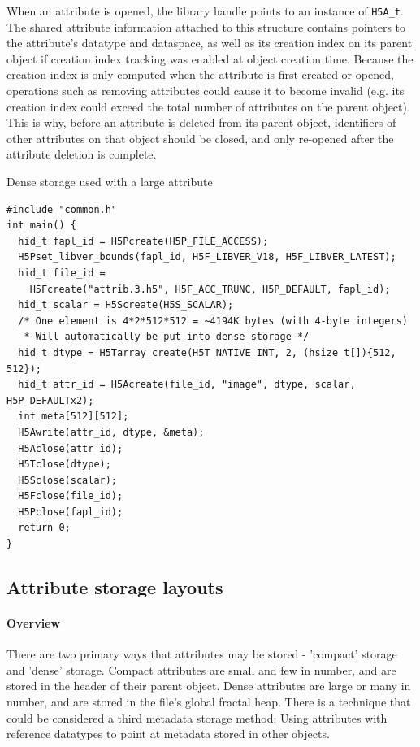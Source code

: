 When an attribute is opened, the library handle points to an instance of \texttt{H5A\_t}. The shared attribute information attached to this structure contains pointers to the attribute's datatype and dataspace, as well as its creation index on its parent object if creation index tracking was enabled at object creation time. Because the creation index is only computed when the attribute is first created or opened, operations such as removing attributes could cause it to become invalid (e.g. its creation index could exceed the total number of attributes on the parent object). This is why, before an attribute is deleted from its parent object, identifiers of other attributes on that object should be closed, and only re-opened after the attribute deletion is complete.

\begin{listing}
\centering
\caption{Dense storage used with a large attribute}
\label{lst:attribute-dense-storage-large}
\begin{verbatim}
#include "common.h"
int main() {
  hid_t fapl_id = H5Pcreate(H5P_FILE_ACCESS);
  H5Pset_libver_bounds(fapl_id, H5F_LIBVER_V18, H5F_LIBVER_LATEST);
  hid_t file_id =
    H5Fcreate("attrib.3.h5", H5F_ACC_TRUNC, H5P_DEFAULT, fapl_id);
  hid_t scalar = H5Screate(H5S_SCALAR);
  /* One element is 4*2*512*512 = ~4194K bytes (with 4-byte integers)
   * Will automatically be put into dense storage */
  hid_t dtype = H5Tarray_create(H5T_NATIVE_INT, 2, (hsize_t[]){512, 512});
  hid_t attr_id = H5Acreate(file_id, "image", dtype, scalar, H5P_DEFAULTx2);
  int meta[512][512];
  H5Awrite(attr_id, dtype, &meta);
  H5Aclose(attr_id);
  H5Tclose(dtype);
  H5Sclose(scalar);
  H5Fclose(file_id);
  H5Pclose(fapl_id);
  return 0;
}
\end{verbatim}
\end{listing}


\subsection{Attribute storage layouts}

\paragraph{Overview} There are two primary ways that attributes may be stored - 'compact' storage and 'dense' storage. Compact attributes are small and few in number, and are stored in the header of their parent object. Dense attributes are large or many in number, and are stored in the file's global fractal heap. There is a technique that could be considered a third metadata storage method: Using attributes with reference datatypes to point at metadata stored in other objects.

